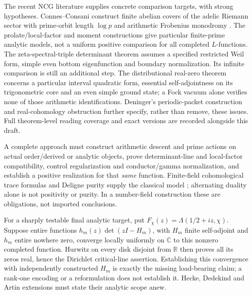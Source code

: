 \documentclass[11pt,oneside,openany]{book}
\theoremstyle{definition}\newtheorem{definition}[theorem]{Definition}
\theoremstyle{remark}\newtheorem{remark}[theorem]{Remark}
\newcommand{\C}{\mathbb C}\newcommand{\Z}{\mathbb Z}\newcommand{\R}{\mathbb R}
\begin{document}
The recent NCG literature supplies concrete comparison targets, with strong hypotheses. Connes--Consani construct finite abelian covers of the adelic Riemann sector with prime-orbit length $\log p$ and arithmetic Frobenius monodromy \cite[Theorem3.12]{ConnesConsaniKnots}. The prolate/local-factor and moment constructions \cite{Prolate,LocalMoments} give particular finite-prime analytic models, not a uniform positive comparison for all completed $L$-functions. The zeta-spectral-triple determinant theorem \cite[Theorem5.10]{ZetaTriples} assumes a specified restricted Weil form, simple even bottom eigenfunction and boundary normalization. Its infinite comparison is still an additional step. The distributional real-zero theorem \cite[Theorem6.1]{QuadraticForms} concerns a particular interval quadratic form, essential self-adjointness on its trigonometric core and an even simple ground state; a Fock vacuum alone verifies none of those arithmetic identifications. Deninger's periodic-packet construction and real-cohomology obstruction \cite{DeningerPackets,DeningerReal} further specify, rather than remove, these issues. Full theorem-level reading coverage and exact versions are recorded alongside this draft.

A complete approach must construct arithmetic descent and prime actions on actual order/derived or analytic objects, prove determinant-line and local-factor compatibility, control regularization and conductor/gamma normalization, and establish a positive realization for that \emph{same} function. Finite-field cohomological trace formulas and Deligne purity supply the classical model \cite{DeligneWeilI,DeligneWeilII}; alternating duality alone is not positivity or purity. In a number-field construction these are obligations, not imported conclusions.

For a sharply testable final analytic target, put $F_\chi(z)=\Lambda(1/2+iz,\chi)$. Suppose entire functions $h_m(z)\det(zI-H_m)$, with $H_m$ finite self-adjoint and $h_m$ entire nowhere zero, converge locally uniformly on $\C$ to this nonzero completed function. Hurwitz on every disk disjoint from $\R$ then proves all its zeros real, hence the Dirichlet critical-line assertion. Establishing this convergence with independently constructed $H_m$ is exactly the missing load-bearing claim; a rank-one encoding or a reformulation does not establish it. Hecke, Dedekind and Artin extensions must state their analytic scope anew.
\end{document}
